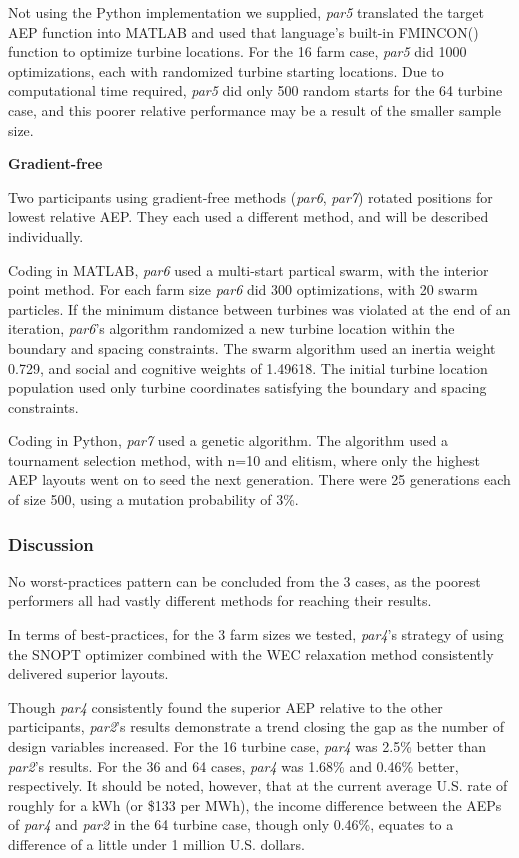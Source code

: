 	Not using the Python implementation we supplied, \textit{par5} translated the target AEP function into MATLAB and used that language's built-in FMINCON() function to optimize turbine locations.
	For the 16 farm case, \textit{par5} did 1000 optimizations, each with randomized turbine starting locations.
	Due to computational time required, \textit{par5} did only 500 random starts for the 64 turbine case, and this poorer relative performance may be a result of the smaller sample size.

	\vspace{3mm}
	\noindent\textbf{Gradient-free}\newline

	Two participants using gradient-free methods (\textit{par6}, \textit{par7}) rotated positions for lowest relative AEP.
	They each used a different method, and will be described individually.

	Coding in MATLAB, \textit{par6} used a multi-start partical swarm, with the interior point method.
	For each farm size \textit{par6} did 300 optimizations, with 20 swarm particles.
	If the minimum distance between turbines was violated at the end of an iteration, \textit{par6}'s algorithm randomized a new turbine location within the boundary and spacing constraints.
	The swarm algorithm used an inertia weight 0.729, and social and cognitive weights of 1.49618.
	The initial turbine location population used only turbine coordinates satisfying the boundary and spacing constraints.

	Coding in Python, \textit{par7} used a genetic algorithm.
	The algorithm used a tournament selection method, with n=10 and elitism, where only the highest AEP layouts went on to seed the next generation.
	There were 25 generations each of size 500, using a mutation probability of 3\%.

\subsubsection{Discussion}

	No worst-practices pattern can be concluded from the 3 cases, as the poorest performers all had vastly different methods for reaching their results.

	In terms of best-practices, for the 3 farm sizes we tested, \textit{par4}'s strategy of using the SNOPT optimizer combined with the WEC relaxation method consistently delivered superior layouts.

	Though \textit{par4} consistently found the superior AEP relative to the other participants, \textit{par2}'s results demonstrate a trend closing the gap as the number of design variables increased.
	For the 16 turbine case, \textit{par4} was 2.5\% better than \textit{par2}'s results.
	For the 36 and 64 cases, \textit{par4} was 1.68\% and 0.46\% better, respectively.
	It should be noted, however, that at the current average U.S. rate\cite{ChooseEnergyCost} of roughly  for a kWh (or \$133 per MWh), the income difference between the AEPs of \textit{par4} and \textit{par2} in the 64 turbine case, though only 0.46\%, equates to a difference of a little under 1 million U.S. dollars.
	
